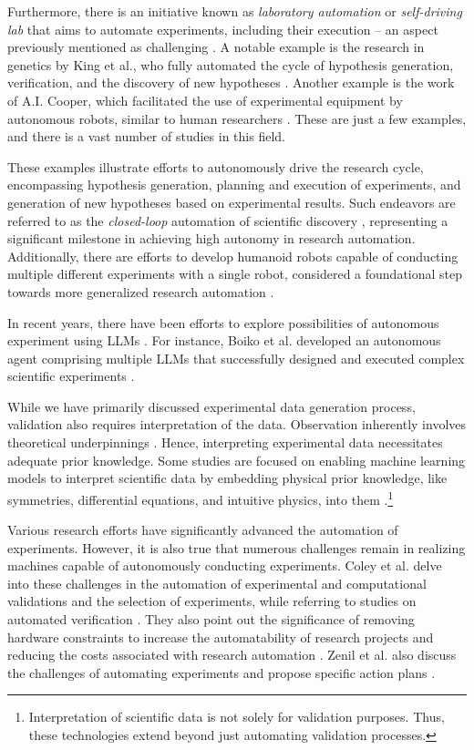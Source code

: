 Furthermore, there is an initiative known as \textit{laboratory automation} or \textit{self-driving lab} that aims to automate experiments, including their execution – an aspect previously mentioned as challenging \cite{holland2020automation,abolhasani2023rise}. A notable example is the research in genetics by King et al., who fully automated the cycle of hypothesis generation, verification, and the discovery of new hypotheses \cite{king2004functional}. Another example is the work of A.I. Cooper, which facilitated the use of experimental equipment by autonomous robots, similar to human researchers \cite{burger2020mobile}. These are just a few examples, and there is a vast number of studies in this field.

These examples illustrate efforts to autonomously drive the research cycle, encompassing hypothesis generation, planning and execution of experiments, and generation of new hypotheses based on experimental results. Such endeavors are referred to as the \textit{closed-loop} automation of scientific discovery \cite{zenil2023future}, representing a significant milestone in achieving high autonomy in research automation. Additionally, there are efforts to develop humanoid robots capable of conducting multiple different experiments with a single robot, considered a foundational step towards more generalized research automation \cite{yachie2017robotic}.

In recent years, there have been efforts to explore possibilities of autonomous experiment using LLMs \cite{boiko2023emergent,qin2023gpt,charness2023generation}. For instance, Boiko et al. developed an autonomous agent comprising multiple LLMs that successfully designed and executed complex scientific experiments \cite{boiko2023emergent}.

While we have primarily discussed experimental data generation process,  validation also requires interpretation of the data. Observation inherently involves theoretical underpinnings \cite{hanson1965patterns}. Hence, interpreting experimental data necessitates adequate prior knowledge. Some studies are focused on enabling machine learning models to interpret scientific data by embedding physical prior knowledge, like symmetries, differential equations, and intuitive physics, into them \cite{hao2022physics,karniadakis2021physics}.\footnote{
Interpretation of scientific data is not solely for validation purposes. Thus, these technologies extend beyond just automating validation processes.
}

Various research efforts have significantly advanced the automation of experiments. However, it is also true that numerous challenges remain in realizing machines capable of autonomously conducting experiments. Coley et al. delve into these challenges in the automation of experimental and computational validations and the selection of experiments, while referring to studies on automated verification \cite{coley2020autonomousII}. They also point out the significance of removing hardware constraints to increase the automatability of research projects and reducing the costs associated with research automation \cite{coley2020autonomousII}. Zenil et al. also discuss the challenges of automating experiments and propose specific action plans \cite{zenil2023}.

